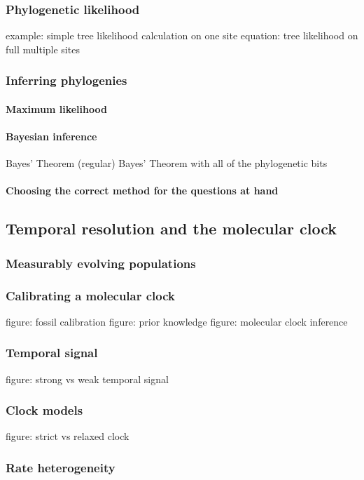       \subsubsection{Phylogenetic likelihood}
      example: simple tree likelihood calculation on one site
      equation: tree likelihood on full multiple sites
      \subsubsection{Inferring phylogenies}
        \paragraph*{Maximum likelihood}
        \paragraph*{Bayesian inference}
        Bayes' Theorem (regular)
        Bayes' Theorem with all of the phylogenetic bits
        \paragraph*{Choosing the correct method for the questions at hand}

    \subsection{Temporal resolution and the molecular clock}
      \subsubsection{Measurably evolving populations}
      \subsubsection{Calibrating a molecular clock}
      figure: fossil calibration
      figure: prior knowledge
      figure: molecular clock inference
      \subsubsection{Temporal signal}
      figure: strong vs weak temporal signal
      \subsubsection{Clock models}
      figure: strict vs relaxed clock
      \subsubsection{Rate heterogeneity}
